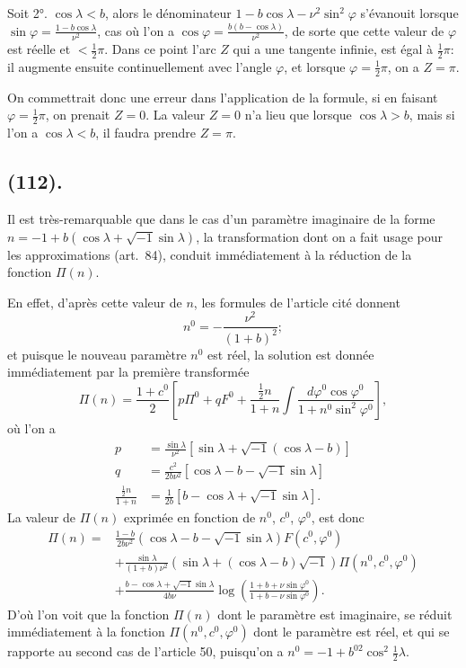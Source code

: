 \documentclass{article}
\begin{document}
Soit 2°. $\cos\lambda<b$, alors le dénominateur $1-b\cos\lambda-\nu^{2}\sin^{2}\varphi$ s'évanouit lorsque $\sin\varphi=\frac{1-b\cos\lambda}{\nu^{2}}$, cas où l'on a $\cos\varphi=\frac{b(b-\cos\lambda)}{\nu^{2}}$, de sorte que cette valeur de $\varphi$ est réelle et $<\frac{1}{2}\pi$. Dans ce point l'arc $Z$ qui a une tangente infinie, est égal à $\frac{1}{2}\pi$: il augmente ensuite continuellement avec l'angle $\varphi$, et lorsque $\varphi=\frac{1}{2}\pi$, on a $Z=\pi$.

On commettrait donc une erreur dans l'application de la formule, si en faisant $\varphi=\frac{1}{2}\pi$, on prenait $Z=0$. La valeur $Z=0$ n'a lieu que lorsque $\cos\lambda>b$, mais si l'on a $\cos\lambda<b$, il faudra prendre $Z=\pi$.

\subsection*{(112).}

Il est très-remarquable que dans le cas d'un paramètre imaginaire de la forme $n=-1+b(\cos\lambda+\sqrt{-1}\sin\lambda)$, la transformation dont on a fait usage pour les approximations (art.\ 84), conduit immédiatement à la réduction de la fonction $\Pi(n)$.

En effet, d'après cette valeur de $n$, les formules de l'article cité donnent
\[ n^{0}=-\frac{\nu^{2}}{(1+b)^{2}}; \]
et puisque le nouveau paramètre $n^{0}$ est réel, la solution est donnée immédiatement par la première transformée
\[ \Pi(n)=\frac{1+c^{0}}{2}\left[p\Pi^{0}+qF^{0}+\frac{\tfrac{1}{2}n}{1+n}\int\frac{d\varphi^{0}\cos\varphi^{0}}{1+n^{0}\sin^{2}\varphi^{0}}\right], \]
où l'on a
\[ \begin{aligned} p&=\frac{\sin\lambda}{\nu^{2}}[\sin\lambda+\sqrt{-1}(\cos\lambda-b)]\\ q&=\frac{c^{2}}{2b\nu^{2}}[\cos\lambda-b-\sqrt{-1}\sin\lambda]\\ \frac{\tfrac{1}{2}n}{1+n}&=\frac{1}{2b}[b-\cos\lambda+\sqrt{-1}\sin\lambda]. \end{aligned} \]
La valeur de $\Pi(n)$ exprimée en fonction de $n^{0}$, $c^{0}$, $\varphi^{0}$, est donc
\[ \begin{aligned} \Pi(n)={}&\frac{1-b}{2b\nu^{2}}(\cos\lambda-b-\sqrt{-1}\sin\lambda)F(c^{0},\varphi^{0})\\ &+\frac{\sin\lambda}{(1+b)\nu^{2}}(\sin\lambda+(\cos\lambda-b)\sqrt{-1})\Pi(n^{0},c^{0},\varphi^{0})\\ &+\frac{b-\cos\lambda+\sqrt{-1}\sin\lambda}{4b\nu}\log\left(\frac{1+b+\nu\sin\varphi^{0}}{1+b-\nu\sin\varphi^{0}}\right). \end{aligned} \]
D'où l'on voit que la fonction $\Pi(n)$ dont le paramètre est imaginaire, se réduit immédiatement à la fonction $\Pi(n^{0},c^{0},\varphi^{0})$ dont le paramètre est réel, et qui se rapporte au second cas de l'article 50, puisqu'on a $n^{0}=-1+b^{02}\cos^{2}\frac{1}{2}\lambda$.
\end{document}
